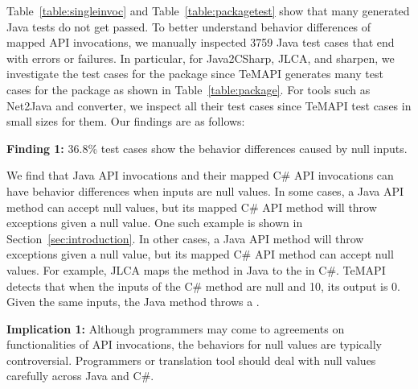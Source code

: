 Table~\ref{table:singleinvoc} and Table~\ref{table:packagetest} show that many generated Java tests do not get passed. To better understand behavior differences of mapped API invocations, we manually inspected 3759 Java test cases that end with errors or failures. In particular, for Java2CSharp, JLCA, and sharpen, we investigate the test cases for the  package since TeMAPI generates many test cases for the package as shown in Table~\ref{table:package}. For tools such as Net2Java and converter, we inspect all their test cases since TeMAPI test cases in small sizes for them. Our findings are as follows:

\textbf{Finding 1:} 36.8\% test cases show the behavior differences caused by null inputs.

We find that Java API invocations and their mapped C\# API invocations can have behavior differences when inputs are null values. In some cases, a Java API method can accept null values, but its mapped C\# API method will throw exceptions given a null value. One such example is shown in Section~\ref{sec:introduction}. In other cases, a Java API method will throw exceptions given a null value, but its mapped C\# API method can accept null values. For example, JLCA maps the  method in Java to the  in C\#. TeMAPI detects that when the inputs of the C\# method are null and 10, its output is 0. Given the same inputs, the Java method throws a .



\textbf{Implication 1:} Although programmers may come to agreements on functionalities of API invocations, the behaviors for null values are typically controversial. Programmers or translation tool should deal with null values carefully across Java and C\#.

